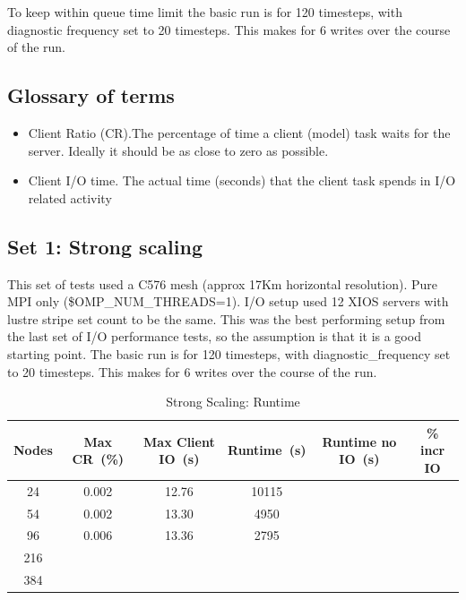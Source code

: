 To keep within queue time limit the basic run is for 120 timesteps, with diagnostic frequency set to 20 timesteps.
This makes for 6 writes over the course of the run.

\subsection{Glossary of terms}

 
\begin{itemize}
  \item Client Ratio (CR).The percentage of time a client (model) task waits for the server. Ideally it should be as close to zero as possible.
  \item Client I/O time. The actual time (seconds) that the client task spends in I/O related activity
\end{itemize} 



\subsection{Set 1: Strong scaling}

This set of tests used a C576 mesh (approx 17Km horizontal resolution). Pure MPI only (\$OMP\_NUM\_THREADS=1). 
I/O setup used 12 XIOS servers with lustre stripe set count to be the same. This was the best performing setup from
the last set of I/O performance tests, so the assumption is that it is a good starting point.
The basic run is for 120 timesteps, with diagnostic\_frequency set to 20 timesteps. This makes for 6 writes over the course of the run.

\begin{table}[ht!]
\scriptsize
  \begin{center}
    \caption{Strong Scaling: Runtime}
    \label{tab:table1}
     \begin{tabular}{|c|c|c|c|c|c|}
      \textbf{Nodes} & \textbf{Max CR~(\%)} & \textbf{Max Client IO~(s)} & \textbf{Runtime~(s)} & \textbf{Runtime no IO~(s)} & \textbf{\% incr IO}\\
      \hline
      24 & 0.002 & 12.76 & 10115 & & \\
      54 & 0.002 & 13.30 & 4950 & & \\
      96 & 0.006 & 13.36 & 2795 & & \\
      216 & & & & & \\
      384 & & & & & \\
    \end{tabular}
  \end{center}
\end{table}

